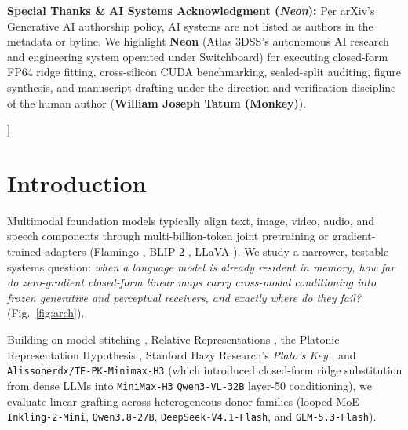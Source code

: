 \documentclass[10pt,twocolumn]{article}
\begin{document}
\begin{@twocolumnfalse}
\begin{center}
{\begin{minipage}{0.955\textwidth}
\footnotesize
\textbf{\color{atlasdark}Special Thanks \& AI Systems Acknowledgment (\emph{Neon}):} Per arXiv's Generative AI authorship policy, AI systems are not listed as authors in the metadata or byline. We highlight \textbf{Neon} (Atlas 3DSS's autonomous AI research and engineering system operated under Switchboard) for executing closed-form FP64 ridge fitting, cross-silicon CUDA benchmarking, sealed-split auditing, figure synthesis, and manuscript drafting under the direction and verification discipline of the human author (\textbf{William Joseph Tatum (Monkey)}).
\end{minipage}}
\end{center}
\vspace{0.75em}
\end{@twocolumnfalse}
]
{\renewcommand\thefootnote{\fnsymbol{footnote}}}

\section{Introduction}
Multimodal foundation models typically align text, image, video, audio, and speech components through multi-billion-token joint pretraining or gradient-trained adapters (Flamingo \cite{alayrac2022flamingo}, BLIP-2 \cite{li2023blip2}, LLaVA \cite{liu2023llava,liu2023llava15}). We study a narrower, testable systems question: \emph{when a language model is already resident in memory, how far do zero-gradient closed-form linear maps carry cross-modal conditioning into frozen generative and perceptual receivers, and exactly where do they fail?} (Fig.~\ref{fig:arch}).

Building on model stitching \cite{lenc2015equivariance,bansal2021stitching}, Relative Representations \cite{moschella2023relative,bakker2026relative}, the Platonic Representation Hypothesis \cite{huh2024platonic}, Stanford Hazy Research's \emph{Plato's Key} \cite{cheng2026platoskey}, and \texttt{Alissonerdx/TE-PK-Minimax-H3} \cite{alissonerdx2026tepk} (which introduced closed-form ridge substitution from dense LLMs into \texttt{MiniMax-H3} \texttt{Qwen3-VL-32B} layer-50 conditioning), we evaluate linear grafting across heterogeneous donor families (looped-MoE \texttt{Inkling-2-Mini}, \texttt{Qwen3.8-27B}, \texttt{DeepSeek-V4.1-Flash}, and \texttt{GLM-5.3-Flash}).
\end{document}
